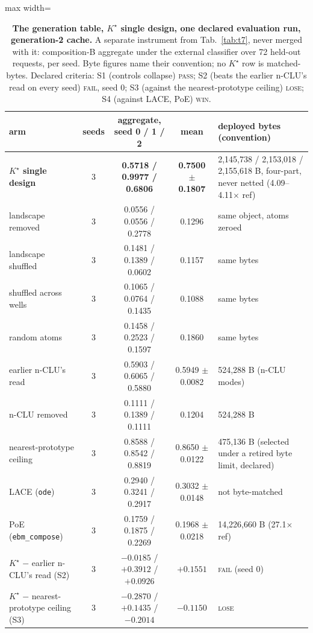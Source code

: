 \documentclass{article} %
\newcommand{\Kstar}{\ensuremath{K^{\star}}}
\begin{document}
\begin{table}[h]
\centering\scriptsize
\caption{\textbf{The generation table, $\Kstar$ single design, one declared evaluation run, %
generation-2 cache.} A separate instrument from Tab.~\ref{tab:t7}, never merged with it:
composition-B aggregate under the external classifier over 72 held-out requests, per seed. %
Byte figures name their convention; no $\Kstar$ row is matched-bytes. Declared criteria: S1
(controls collapse) \textsc{pass}; S2 (beats the earlier n-CLU's read on every seed) \textsc{fail}, seed 0;
S3 (against the nearest-prototype ceiling) \textsc{lose}; S4 (against LACE, PoE) \textsc{win}.}
\label{tab:gentable-kstar}
\setlength{\tabcolsep}{2.4pt}
\begin{adjustbox}{max width=\linewidth}\begin{tabular}{lcccp{4.2cm}}
\toprule
arm & seeds & aggregate, seed 0 / 1 / 2 & mean & deployed bytes (convention) \\
\midrule
\textbf{$\Kstar$ single design} & 3 & \textbf{0.5718 / 0.9977 / 0.6806} & \textbf{0.7500 $\pm$ 0.1807} & 2,145,738 / 2,153,018 / 2,155,618 B, four-part, never netted (4.09--4.11$\times$ ref) \\
\quad landscape removed & 3 & 0.0556 / 0.0556 / 0.2778 & 0.1296 & same object, atoms zeroed \\
\quad landscape shuffled & 3 & 0.1481 / 0.1389 / 0.0602 & 0.1157 & same bytes \\
\quad shuffled across wells & 3 & 0.1065 / 0.0764 / 0.1435 & 0.1088 & same bytes \\
\quad random atoms & 3 & 0.1458 / 0.2523 / 0.1597 & 0.1860 & same bytes \\
earlier n-CLU's read & 3 & 0.5903 / 0.6065 / 0.5880 & 0.5949 $\pm$ 0.0082 & 524,288 B (n-CLU modes) \\
n-CLU removed & 3 & 0.1111 / 0.1389 / 0.1111 & 0.1204 & 524,288 B \\
nearest-prototype ceiling & 3 & 0.8588 / 0.8542 / 0.8819 & 0.8650 $\pm$ 0.0122 & 475,136 B (selected under a retired byte limit, declared) \\
LACE (\texttt{ode}) & 3 & 0.2940 / 0.3241 / 0.2917 & 0.3032 $\pm$ 0.0148 & not byte-matched \\
PoE (\texttt{ebm\_compose}) & 3 & 0.1759 / 0.1875 / 0.2269 & 0.1968 $\pm$ 0.0218 & 14,226,660 B (27.1$\times$ ref) \\
\midrule
$\Kstar$ $-$ earlier n-CLU's read (S2) & 3 & $-0.0185$ / $+0.3912$ / $+0.0926$ & $+0.1551$ & \textsc{fail} (seed 0) \\
$\Kstar$ $-$ nearest-prototype ceiling (S3) & 3 & $-0.2870$ / $+0.1435$ / $-0.2014$ & $-0.1150$ & \textsc{lose} \\
\bottomrule
\end{tabular}\end{adjustbox}
\end{table}
\end{document}
